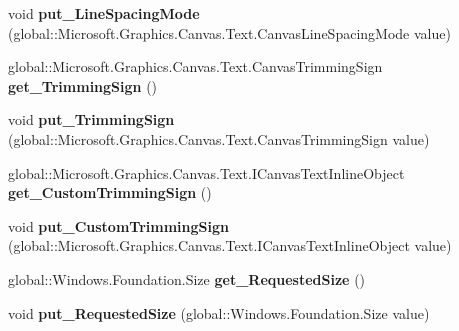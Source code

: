 \begin{DoxyCompactItemize}
void {\bfseries put\+\_\+\+Line\+Spacing\+Mode} (global\+::\+Microsoft.\+Graphics.\+Canvas.\+Text.\+Canvas\+Line\+Spacing\+Mode value)
\item 
\mbox{\label{class_microsoft_1_1_graphics_1_1_canvas_1_1_text_1_1_canvas_text_layout_a5c236351aff1b822b001c6d58d99a4ef}} 
global\+::\+Microsoft.\+Graphics.\+Canvas.\+Text.\+Canvas\+Trimming\+Sign {\bfseries get\+\_\+\+Trimming\+Sign} ()
\item 
\mbox{\label{class_microsoft_1_1_graphics_1_1_canvas_1_1_text_1_1_canvas_text_layout_a6038b04e1633c19a344323c3adb9048c}} 
void {\bfseries put\+\_\+\+Trimming\+Sign} (global\+::\+Microsoft.\+Graphics.\+Canvas.\+Text.\+Canvas\+Trimming\+Sign value)
\item 
\mbox{\label{class_microsoft_1_1_graphics_1_1_canvas_1_1_text_1_1_canvas_text_layout_a5dc8d39fbd74051d1f66f159c55ef5f3}} 
global\+::\+Microsoft.\+Graphics.\+Canvas.\+Text.\+I\+Canvas\+Text\+Inline\+Object {\bfseries get\+\_\+\+Custom\+Trimming\+Sign} ()
\item 
\mbox{\label{class_microsoft_1_1_graphics_1_1_canvas_1_1_text_1_1_canvas_text_layout_a31d76ac5905938caf13ffb5911f8303a}} 
void {\bfseries put\+\_\+\+Custom\+Trimming\+Sign} (global\+::\+Microsoft.\+Graphics.\+Canvas.\+Text.\+I\+Canvas\+Text\+Inline\+Object value)
\item 
\mbox{\label{class_microsoft_1_1_graphics_1_1_canvas_1_1_text_1_1_canvas_text_layout_adebf612a8df4663884f5d4a38f41ea39}} 
global\+::\+Windows.\+Foundation.\+Size {\bfseries get\+\_\+\+Requested\+Size} ()
\item 
\mbox{\label{class_microsoft_1_1_graphics_1_1_canvas_1_1_text_1_1_canvas_text_layout_a2f3f911ee1fbeb9d18674696d30e71ad}} 
void {\bfseries put\+\_\+\+Requested\+Size} (global\+::\+Windows.\+Foundation.\+Size value)
\item 
\mbox{\label{class_microsoft_1_1_graphics_1_1_canvas_1_1_text_1_1_canvas_text_layout_a238de0e21932bea51610979705559db4}} 

\end{DoxyCompactItemize}
